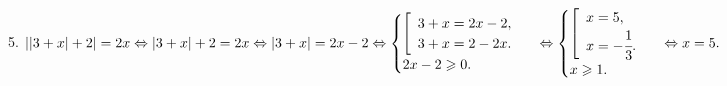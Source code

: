 5. $||3+x|+2|=2x\Leftrightarrow|3+x|+2=2x\Leftrightarrow|3+x|=2x-2\Leftrightarrow\begin{cases}\left[\begin{array}{l} 3+x=2x-2,\\ 3+x=2-2x.\end{array}\right.\\2x-2\geqslant0.\end{cases}\Leftrightarrow\begin{cases}\left[\begin{array}{l} x=5,\\ x=-\cfrac{1}{3}.\end{array}\right.\\x\geqslant1.\end{cases}\Leftrightarrow x=5.$\\
